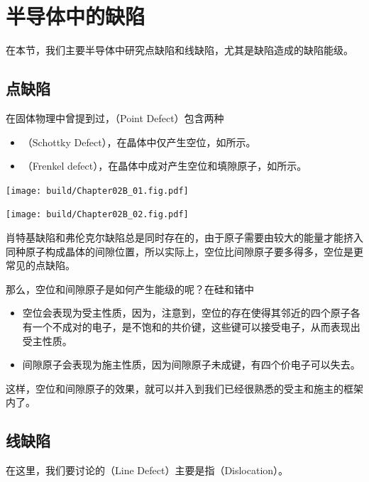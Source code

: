 \section{半导体中的缺陷}
在本节，我们主要半导体中研究点缺陷和线缺陷，尤其是缺陷造成的缺陷能级。

\subsection{点缺陷}
在固体物理中曾提到过，（Point Defect）包含两种
\begin{itemize}
    \item {}（Schottky Defect），在晶体中仅产生空位，如所示。
    \item {}（Frenkel defect），在晶体中成对产生空位和填隙原子，如所示。
\end{itemize}

\begin{Figure}[点缺陷]
    \begin{FigureSub}[肖特基缺陷]
        \texttt{[image: build/Chapter02B\_01.fig.pdf]}
    \end{FigureSub}
    \hspace{1.5cm}
    \begin{FigureSub}[弗伦克尔缺陷]
        \texttt{[image: build/Chapter02B\_02.fig.pdf]}
    \end{FigureSub}
\end{Figure}

肖特基缺陷和弗伦克尔缺陷总是同时存在的，由于原子需要由较大的能量才能挤入同种原子构成晶体的间隙位置，所以实际上，空位比间隙原子要多得多，空位是更常见的点缺陷。

那么，空位和间隙原子是如何产生能级的呢？在硅和锗中
\begin{itemize}
    \item 空位会表现为受主性质，因为，注意到，空位的存在使得其邻近的四个原子各有一个不成对的电子，是不饱和的共价键，这些键可以接受电子，从而表现出受主性质。
    \item 间隙原子会表现为施主性质，因为间隙原子未成键，有四个价电子可以失去。
\end{itemize}
这样，空位和间隙原子的效果，就可以并入到我们已经很熟悉的受主和施主的框架内了。

\subsection{线缺陷}
在这里，我们要讨论的（Line Defect）主要是指（Dislocation）\cite{W9}。

